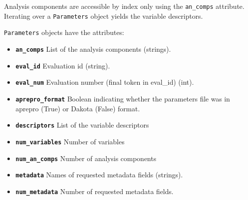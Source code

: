 Analysis components are accessible by index only using the {\tt an\_comps} attribute. Iterating over a {\tt Parameters} 
object yields the variable descriptors.

{\tt Parameters} objects have the attributes:

\begin{itemize}

  \item{} \label{index:dakota.interfacing.Parameters.an_comps}\textbf{\texttt{an\_comps}} List of the analysis components (strings).

  \item{} \label{index:dakota.interfacing.Parameters.eval_id}\textbf{\texttt{eval\_id}} Evaluation id (string).

  \item{} \label{index:dakota.interfacing.Parameters.eval_num}\textbf{\texttt{eval\_num}} Evaluation number (final token in eval\_id) (int).


  \item{} \label{index:dakota.interfacing.Parameters.aprepro_format}\textbf{\texttt{aprepro\_format}} Boolean indicating whether the parameters file was in aprepro (True) or Dakota (False) format.

  \item{}\label{index:dakota.interfacing.Parameters.descriptors}\textbf{\texttt{descriptors}} List of the variable descriptors

  \item{} \label{index:dakota.interfacing.Parameters.num_variables}\textbf{\texttt{num\_variables}} Number of variables

  \item{}\label{index:dakota.interfacing.Parameters.num_an_comps}\textbf{\texttt{num\_an\_comps}} Number of analysis components

  \item{} \label{index:dakota.interfacing.Parameters.metadata}\textbf{\texttt{metadata}} Names of requested metadata fields (strings).

  \item{} \label{index:dakota.interfacing.Parameters.num_metadata}\textbf{\texttt{num\_metadata}} Number of requested metadata fields.

\end{itemize}

